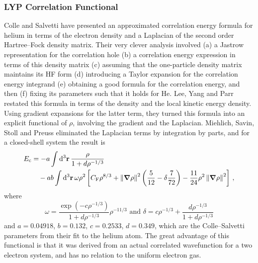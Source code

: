 \documentclass{article}
\theoremstyle{plain}\theoremheaderfont{\normalfont\itshape}\theorembodyfont{\rmfamily}\theoremseparator{.}\newtheorem*{rem}{Remark}\newtheorem*{ex}{Example}\newtheorem*{proof}{Proof}\newtheorem*{altp}{Alternative proof}
\theoremstyle{plain}\theoremheaderfont{\normalfont\bfseries}\theorembodyfont{\rmfamily}\theoremseparator{.}\newtheorem{thm}{Theorem}[section]\newtheorem{lem}[thm]{Lemma}\newtheorem{prop}[thm]{Proposition}\newtheorem*{cor}{Corollary}\newtheorem{defn}[thm]{Definition}\newtheorem{clm}[thm]{Claim}\newtheorem{clminproof}{Claim}
\theoremstyle{break}\theoremheaderfont{\normalfont\itshape}\theorembodyfont{\rmfamily}\theoremseparator{.\medskip}\newtheorem*{proofskip}{Proof}\newtheorem*{exs}{Examples}\newtheorem*{rems}{Remarks}
\theoremstyle{break}\theoremheaderfont{\normalfont\bfseries}\theorembodyfont{\rmfamily}\theoremseparator{.\medskip}\newtheorem{lemskip}[thm]{Lemma}\newtheorem{defnskip}[thm]{Definition}\newtheorem{propskip}[thm]{Proposition}\newtheorem{thmskip}[thm]{Theorem}
\numberwithin{equation}{section}
\newcommand{\dd}[2][]{\mathrm{d}^{#1} #2\,}
\newcommand{\vb}[1]{\bm{\mathrm{#1}}}
\newcommand{\norm}[1]{\left\| #1 \right\|}
\newcommand{\grad}{\vb{\nabla}}
\newcommand{\corr}{_{\text{c}}}
\begin{document}
    \subsubsection{LYP Correlation Functional}
    Colle and Salvetti have presented an approximated correlation energy formula for helium in terms of the electron density and a Laplacian of the second order Hartree--Fock density matrix. Their very clever analysis involved (a) a Jastrow representation for the correlation hole (b) a correlation energy expression in terms of this density matrix (c) assuming that the one-particle density matrix maintains its HF form (d) introducing a Taylor expansion for the correlation energy integrand (e) obtaining a good formula for the correlation energy, and then (f) fixing its parameters such that it holds for He. Lee, Yang and Parr restated this formula in terms of the density and the local kinetic energy density. Using gradient expansions for the latter term, they turned this formula into an explicit functional of \(\rho\), involving the gradient and the Laplacian. Miehlich, Savin, Stoll and Preuss eliminated the Laplacian terms by integration by parts, and for a closed-shell system the result is
    \begin{align}
        E\corr&=-a\int\dd[3]{\vb{r}}\frac{\rho}{1+d\rho^{-1/3}}\notag\\
        &\quad -ab\int\dd[3]{\vb{r}}\omega\rho^2\left[C_{\text{F}}\rho^{8/3}+\norm{\grad\rho}^2\left(\frac{5}{12}-\delta\frac{7}{72}\right)-\frac{11}{24}\rho^2\norm{\grad\rho}^2\right]\,,
    \end{align}
    where
    \begin{equation}
        \omega=\frac{\exp(-c\rho^{-1/3})}{1+d\rho^{-1/3}}\rho^{-11/3}\text{ and }\delta=c\rho^{-1/3}+\frac{d\rho^{-1/3}}{1+d\rho^{-1/3}}
    \end{equation}
    and \(a=0.04918\), \(b=0.132\), \(c=0.2533\), \(d=0.349\), which are the Colle--Salvetti parameters from their fit to the helium atom. The great advantage of this functional is that it was derived from an actual correlated wavefunction for a two electron system, and has no relation to the uniform electron gas.
\end{document}
